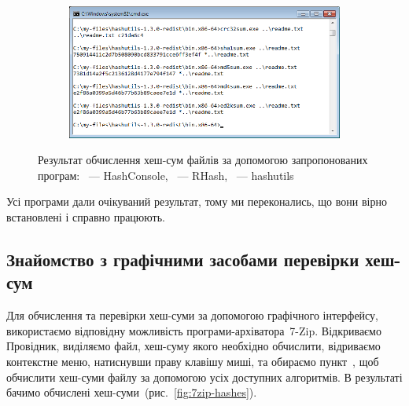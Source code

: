 \documentclass[
	a4paper,
	oneside,
	BCOR = 10mm,
	DIV = 12,
	12pt,
	headings = normal,
]{scrartcl}
\newlength{\gridunitwidth}
\begin{document}
\begin{figure}[!htbp]
\begin{subfigure}[b]{6\gridunitwidth - 1em / 2}
					\caption{}
					\label{subfig:win-cmd-hash-results-rhash}
				\end{subfigure}
				\begin{subfigure}{6\gridunitwidth - 1em / 2}
					\centering
					\includegraphics[width = \columnwidth]{./assets/04.png}
					\caption{}
					\label{subfig:win-cmd-hash-results-hashutils}
				\end{subfigure}%
				\caption{Результат обчислення хеш-сум файлів за допомогою запропонованих програм: ~— \textenglish{HashConsole}, ~— \textenglish{RHash}, ~— \textenglish{hashutils}}
				\label{fig:win-cmd-hash-results}
			\end{figure}

			Усі програми дали очікуваний результат, тому ми переконались, що вони вірно встановлені і справно працюють.

		\subsection{Знайомство з графічними засобами перевірки хеш-сум}
			Для обчислення та перевірки хеш-суми за допомогою графічного інтерфейсу, використаємо відповідну можливість програми-архіватора~\textenglish{7-Zip}. Відкриваємо Провідник, виділяємо файл, хеш-суму якого необхідно обчислити, відриваємо контекстне меню, натиснувши праву клавішу миші, та обираємо пункт~, щоб обчислити хеш-суми файлу за допомогою усіх доступних алгоритмів. В результаті бачимо обчислені хеш-суми~(рис.~\ref{fig:7zip-hashes}).
\end{document}
